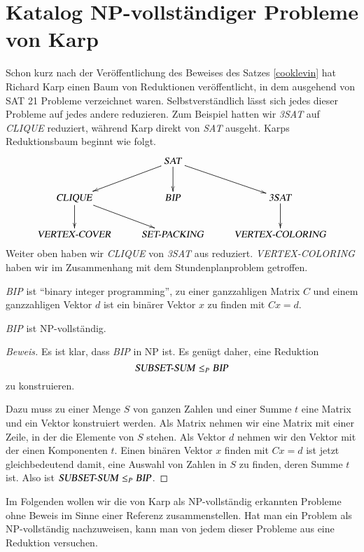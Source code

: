 %
%
%
\section{Katalog NP-vollständiger Probleme von Karp}
%
%
Schon kurz nach der Veröffentlichung des Beweises des Satzes
\ref{cooklevin} hat Richard Karp einen Baum von Reduktionen
veröffentlicht, in dem ausgehend von SAT 21 Probleme verzeichnet
waren.
Selbstverständlich lässt
sich jedes dieser Probleme auf jedes andere reduzieren.
Zum Beispiel
hatten wir \textsl{3SAT} auf \textsl{CLIQUE} reduziert, während
Karp direkt von \textsl{SAT} ausgeht.
Karps Reduktionsbaum beginnt wie folgt.
\[
\xymatrix{
{}
	&\text{\textsl{SAT}} \ar[dl] \ar[d] \ar[dr]
\\
\text{\textsl{CLIQUE}} \ar[d] \ar[dr]
	&\text{\textsl{BIP}}
		&\text{\textsl{3SAT}} \ar[d]
\\
\text{\textsl{VERTEX-COVER}}
	&\text{\textsl{SET-PACKING}}
		&\text{\textsl{VERTEX-COLORING}}
}
\]
Weiter oben haben wir \textsl{CLIQUE} von \textsl{3SAT} aus
reduziert.
\textsl{VERTEX-COLORING} haben wir im Zusammenhang
mit dem Stundenplanproblem getroffen.

%
\textsl{BIP} ist ``binary integer programming'', zu einer ganzzahligen
Matrix $C$ und einem ganzzahligen Vektor $d$ ist ein binärer
Vektor $x$ zu finden mit $Cx=d$.

\begin{satz}
\textsl{BIP} ist NP-vollständig.
\end{satz}

\begin{proof}[Beweis]
Es ist klar, dass \textsl{BIP} in NP ist.
Es genügt daher, eine Reduktion
\[
\text{\textsl{SUBSET-SUM}}\le_P\text{\textsl{BIP}}
\]
zu konstruieren.

Dazu muss zu einer Menge $S$ von ganzen Zahlen und einer Summe $t$
eine Matrix und ein Vektor konstruiert werden.
Als Matrix nehmen wir
eine Matrix mit einer Zeile, in der die Elemente von $S$ stehen.
Als Vektor $d$ nehmen wir den Vektor mit der einen Komponenten $t$.
Einen binären Vektor $x$ finden mit $Cx=d$ ist jetzt gleichbedeutend
damit, eine Auswahl von Zahlen in $S$ zu finden, deren Summe $t$ ist.
Also ist
$\text{\textsl{SUBSET-SUM}}\le_P\text{\textsl{BIP}}$.
\end{proof}

Im Folgenden wollen wir die von Karp als NP-vollständig erkannten Probleme
ohne Beweis im Sinne einer Referenz zusammenstellen.
Hat man ein
Problem als NP-vollständig nachzuweisen, kann man von jedem dieser
Probleme aus eine Reduktion versuchen.

